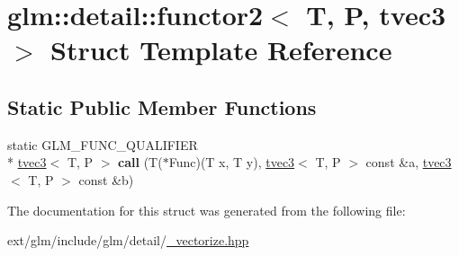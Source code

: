 \hypertarget{structglm_1_1detail_1_1functor2_3_01_t_00_01_p_00_01tvec3_01_4}{\section{glm\-:\-:detail\-:\-:functor2$<$ T, P, tvec3 $>$ Struct Template Reference}
\label{structglm_1_1detail_1_1functor2_3_01_t_00_01_p_00_01tvec3_01_4}
}
\subsection*{Static Public Member Functions}
\begin{DoxyCompactItemize}
\item 
\hypertarget{structglm_1_1detail_1_1functor2_3_01_t_00_01_p_00_01tvec3_01_4_a2dc546f8027af1bbceab38b5a2b5a146}{static G\-L\-M\-\_\-\-F\-U\-N\-C\-\_\-\-Q\-U\-A\-L\-I\-F\-I\-E\-R \\*
\hyperlink{structglm_1_1tvec3}{tvec3}$<$ T, P $>$ {\bfseries call} (T($\ast$Func)(T x, T y), \hyperlink{structglm_1_1tvec3}{tvec3}$<$ T, P $>$ const \&a, \hyperlink{structglm_1_1tvec3}{tvec3}$<$ T, P $>$ const \&b)}\label{structglm_1_1detail_1_1functor2_3_01_t_00_01_p_00_01tvec3_01_4_a2dc546f8027af1bbceab38b5a2b5a146}

\end{DoxyCompactItemize}


The documentation for this struct was generated from the following file\-:\begin{DoxyCompactItemize}
\item 
ext/glm/include/glm/detail/\hyperlink{__vectorize_8hpp}{\-\_\-vectorize.\-hpp}\end{DoxyCompactItemize}

